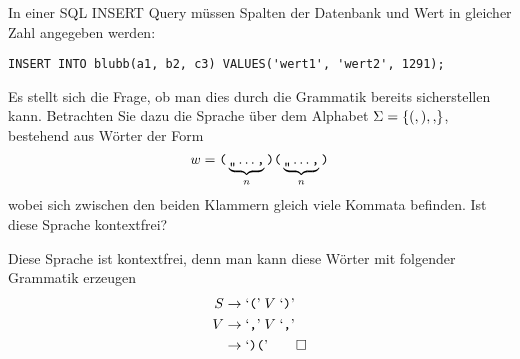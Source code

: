 In einer SQL INSERT Query müssen Spalten der Datenbank und Wert
in gleicher Zahl angegeben werden:
\begin{verbatim}
INSERT INTO blubb(a1, b2, c3) VALUES('wert1', 'wert2', 1291);
\end{verbatim}
Es stellt sich die Frage, ob man dies durch die Grammatik bereits
sicherstellen kann.
Betrachten Sie dazu die Sprache über dem Alphabet 
$\Sigma= \{ {\tt (}, {\tt )}, {\tt ,}\}$, bestehend aus Wörter der
Form
\[
w=
\text{\tt (}\underbrace{\text{\tt ,,}\dots\text{\tt ,}}_{n}
\text{\tt)(}\underbrace{\text{\tt,,}\dots\text{\tt ,}}_{n}\text{\tt )}
\]
wobei sich zwischen den beiden Klammern gleich viele Kommata befinden.
Ist diese Sprache kontextfrei?

\begin{loesung}
Diese Sprache ist kontextfrei, denn man kann diese Wörter mit folgender
Grammatik erzeugen
\begin{align*}
S&\rightarrow \text{`{\tt (}'}\; V \; \text{`{\tt )}'}\\
V&\rightarrow \text{`{\tt ,}'}\; V \; \text{`{\tt ,}'}\\
 &\rightarrow \text{`{\tt )(}'}
\qedhere
\end{align*}
\end{loesung}

